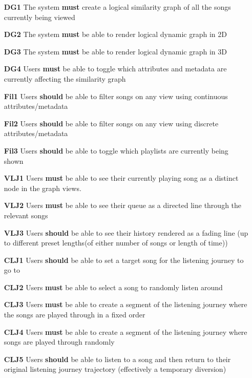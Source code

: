 \begin{itemize}
    \item[\textbf{DG1}] The system \textbf{must} create a logical similarity graph of all the songs currently being viewed
    \item[\textbf{DG2}] The system \textbf{must} be able to render logical dynamic graph in 2D
    \item[\textbf{DG3}] The system \textbf{must} be able to render logical dynamic graph in 3D
    \item[\textbf{DG4}] Users \textbf{must} be able to toggle which attributes and metadata are currently affecting the similarity graph
    \item[\textbf{Fil1}] Users \textbf{should} be able to filter songs on any view using continuous attributes/metadata
    \item[\textbf{Fil2}] Users \textbf{should} be able to filter songs on any view using discrete attributes/metadata
    \item[\textbf{Fil3}] Users \textbf{should} be able to toggle which playlists are currently being shown
    \item[\textbf{VLJ1}] Users \textbf{must} be able to see their currently playing song as a distinct node in the graph views.
    \item[\textbf{VLJ2}] Users \textbf{must} be able to see their queue as a directed line through the relevant songs
    \item[\textbf{VLJ3}] Users \textbf{should} be able to see their history rendered as a fading line (up to different preset lengths(of either number of songs or length of time))
    \item[\textbf{CLJ1}] Users \textbf{should} be able to set a target song for the listening journey to go to
    \item[\textbf{CLJ2}] Users \textbf{must} be able to select a song to randomly listen around
    \item[\textbf{CLJ3}] Users \textbf{must} be able to create a segment of the listening journey where the songs are played through in a fixed order
    \item[\textbf{CLJ4}] Users \textbf{must} be able to create a segment of the listening journey where songs are played through randomly
    \item[\textbf{CLJ5}] Users \textbf{should} be able to listen to a song and then return to their original listening journey trajectory (effectively a temporary diversion)

\end{itemize}
